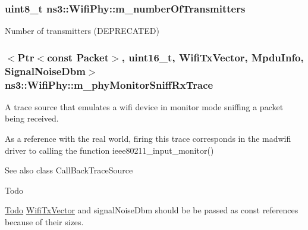 \subsubsection[{\texorpdfstring{m\+\_\+number\+Of\+Transmitters}{m_numberOfTransmitters}}]{\setlength{\rightskip}{0pt plus 5cm}uint8\+\_\+t ns3\+::\+Wifi\+Phy\+::m\+\_\+number\+Of\+Transmitters\hspace{0.3cm}{\ttfamily [private]}}\hypertarget{classns3_1_1WifiPhy_a332193b00d6a840263ba8e1c7661bb31}{}\label{classns3_1_1WifiPhy_a332193b00d6a840263ba8e1c7661bb31}


Number of transmitters (D\+E\+P\+R\+E\+C\+A\+T\+ED) 

\subsubsection[{\texorpdfstring{m\+\_\+phy\+Monitor\+Sniff\+Rx\+Trace}{m_phyMonitorSniffRxTrace}}]{$<${\bf Ptr}$<$const {\bf Packet}$>$, uint16\+\_\+t, {\bf Wifi\+Tx\+Vector}, {\bf Mpdu\+Info}, {\bf Signal\+Noise\+Dbm}$>$ ns3\+::\+Wifi\+Phy\+::m\+\_\+phy\+Monitor\+Sniff\+Rx\+Trace\hspace{0.3cm}{\ttfamily [private]}}\hypertarget{classns3_1_1WifiPhy_ae1bb9ca40837a43219f2be0aadbdc02b}{}\label{classns3_1_1WifiPhy_ae1bb9ca40837a43219f2be0aadbdc02b}
A trace source that emulates a wifi device in monitor mode sniffing a packet being received.

As a reference with the real world, firing this trace corresponds in the madwifi driver to calling the function ieee80211\+\_\+input\+\_\+monitor()

\begin{DoxySeeAlso}{See also}
class Call\+Back\+Trace\+Source 
\end{DoxySeeAlso}
\begin{DoxyRefDesc}{Todo}
\item[\hyperlink{todo__todo000178}{Todo}]\hyperlink{classns3_1_1WifiTxVector}{Wifi\+Tx\+Vector} and signal\+Noise\+Dbm should be be passed as const references because of their sizes. \end{DoxyRefDesc}
